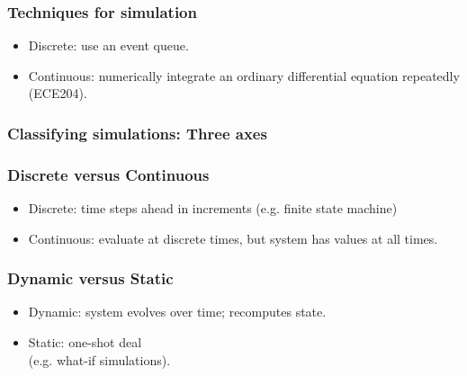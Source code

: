 \begin{frame}
\frametitle{Techniques for simulation}

\Large
\begin{changemargin}{1cm}
\begin{itemize}
\item Discrete: use an event queue.
\item Continuous: numerically integrate an ordinary differential equation repeatedly (ECE204).
\end{itemize}
\end{changemargin}
\end{frame}

\begin{frame}
\frametitle{Classifying simulations: Three axes}

\begin{center}
\end{center}

\end{frame}

\begin{frame}
\frametitle{Discrete versus Continuous}

\Large
\begin{changemargin}{1cm}
\begin{itemize}
\item Discrete: time steps ahead in increments (e.g. finite state machine)
\item Continuous: evaluate at discrete times, but system has values at all times.
\end{itemize}
\end{changemargin}
\end{frame}

\begin{frame}
\frametitle{Dynamic versus Static}

\Large
\begin{changemargin}{1cm}
\begin{itemize}
\item Dynamic: system evolves over time; recomputes state.
\item Static: one-shot deal \\(e.g. what-if simulations).
\end{itemize}
\end{changemargin}
\end{frame}


